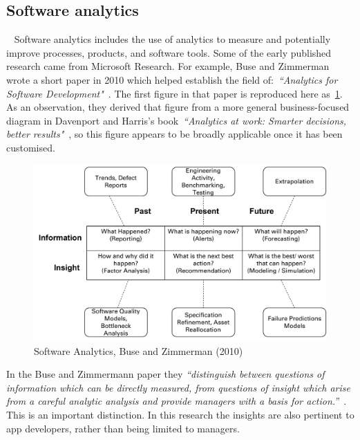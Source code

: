 \subsection{Software analytics}~\label{rw-software-analytics-topic}
Software analytics includes the use of analytics to measure and potentially improve processes, products, and software tools. Some of the early published research came from Microsoft Research. For example, Buse and Zimmerman wrote a short paper in 2010 which helped establish the field of:~\emph{``Analytics for Software Development"}~. The first figure in that paper is reproduced here as~\ref{fig:software_analytics_buse_and_zimmerman_2010}. As an observation, they derived that figure from a more general business-focused diagram in Davenport and Harris's book~\emph{``Analytics at work: Smarter decisions, better results"}~, so this figure appears to be broadly applicable once it has been customised. %

\begin{figure}
    \centering
    \includegraphics[width=\linewidth]{images/related-work/buse_and_zimmermann_2010_figure_a.pdf}
    \caption{Software Analytics, Buse and Zimmerman (2010)}
    \label{fig:software_analytics_buse_and_zimmerman_2010}
\end{figure}


In the Buse and Zimmermann paper they \emph{``distinguish between questions of information which can be directly measured, from questions of insight which arise from a careful analytic analysis and provide managers with a basis for action.''}~. This is an important distinction. In this research the insights  are also pertinent to app developers, rather than being limited to managers.

